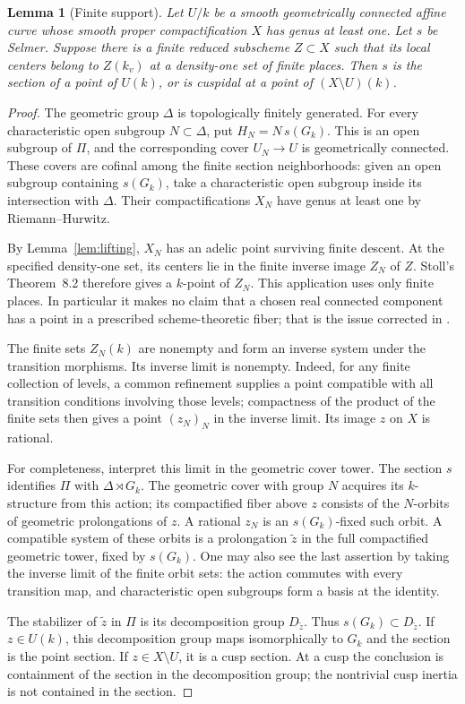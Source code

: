 \documentclass[11pt,a4paper]{article}
\theoremstyle{plain}
\newtheorem{lemma}[theorem]{Lemma}
\theoremstyle{definition}
\begin{document}
\begin{lemma}[Finite support]\label{lem:finite-support}
Let $U/k$ be a smooth geometrically connected affine curve whose smooth
proper compactification $X$ has genus at least one. Let $s$ be Selmer.
Suppose there is a finite reduced subscheme $Z\subset X$ such that its
local centers belong to $Z(k_v)$ at a density-one set of finite places.
Then $s$ is the section of a point of $U(k)$, or is cuspidal at a point
of $(X\setminus U)(k)$.
\end{lemma}
\begin{proof}
The geometric group $\Delta$ is topologically finitely generated.
For every characteristic open subgroup $N\subset\Delta$, put
$H_N=N\,s(G_k)$. This is an open subgroup of $\Pi$, and the corresponding
cover $U_N\to U$ is geometrically connected. These covers are cofinal
among the finite section neighborhoods: given an open subgroup
containing $s(G_k)$, take a characteristic open subgroup inside its
intersection with $\Delta$. Their compactifications $X_N$ have genus
at least one by Riemann--Hurwitz.

By Lemma~\ref{lem:lifting}, $X_N$ has an adelic point surviving finite
descent. At the specified density-one set, its centers lie in the finite
inverse image $Z_N$ of $Z$. Stoll's Theorem~8.2 therefore gives a
$k$-point of $Z_N$. This application uses only finite places. In
particular it makes no claim that a chosen real connected component
has a point in a prescribed scheme-theoretic fiber; that is the issue
corrected in \citet[\S3]{stollerrata}.

The finite sets $Z_N(k)$ are nonempty and form an inverse system under
the transition morphisms. Its inverse limit is nonempty. Indeed, for
any finite collection of levels, a common refinement supplies a point
compatible with all transition conditions involving those levels;
compactness of the product of the finite sets then gives a point
$(z_N)_N$ in the inverse limit. Its image $z$ on $X$ is rational.

For completeness, interpret this limit in the geometric cover tower.
The section $s$ identifies $\Pi$ with $\Delta\rtimes G_k$. The geometric
cover with group $N$ acquires its $k$-structure from this action; its
compactified fiber above $z$ consists of the $N$-orbits of geometric
prolongations of $z$. A rational $z_N$ is an $s(G_k)$-fixed such orbit.
A compatible system of these orbits is a prolongation $\widetilde z$
in the full compactified geometric tower, fixed by $s(G_k)$. One may
also see the last assertion by taking the inverse limit of the finite
orbit sets: the action commutes with every transition map, and
characteristic open subgroups form a basis at the identity.

The stabilizer of $\widetilde z$ in $\Pi$ is its decomposition group
$D_{\widetilde z}$. Thus
$s(G_k)\subset D_{\widetilde z}$. If $z\in U(k)$, this decomposition
group maps isomorphically to $G_k$ and the section is the point section.
If $z\in X\setminus U$, it is a cusp section. At a cusp the conclusion
is containment of the section in the decomposition group; the
nontrivial cusp inertia is not contained in the section.
\end{proof}
\end{document}
